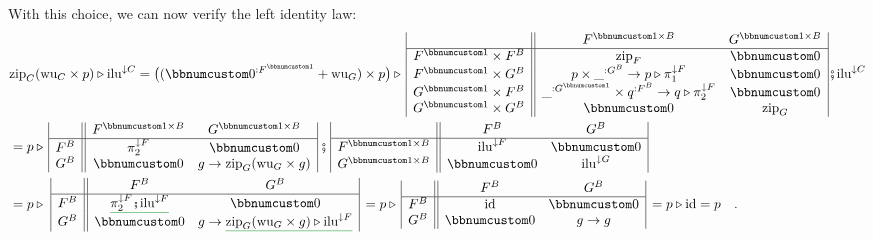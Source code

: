 With this choice, we can now verify the left identity law:
\begin{align*}
 & \text{zip}_{C}(\text{wu}_{C}\times p)\triangleright\text{ilu}^{\downarrow C}=\big((\bbnum 0^{:F^{\bbnum 1}}+\text{wu}_{G})\times p\big)\triangleright\,\begin{array}{|c||cc|}
 & F^{\bbnum 1\times B} & G^{\bbnum 1\times B}\\
\hline F^{\bbnum 1}\times F^{B} & \text{zip}_{F} & \bbnum 0\\
F^{\bbnum 1}\times G^{B} & p\times\_^{:G^{B}}\rightarrow p\triangleright\pi_{1}^{\downarrow F} & \bbnum 0\\
G^{\bbnum 1}\times F^{B} & \_^{:G^{\bbnum 1}}\times q^{:F^{B}}\rightarrow q\triangleright\pi_{2}^{\downarrow F} & \bbnum 0\\
G^{\bbnum 1}\times G^{B} & \bbnum 0 & \text{zip}_{G}
\end{array}\bef\text{ilu}^{\downarrow C}\\
 & =p\triangleright\,\begin{array}{|c||cc|}
 & F^{\bbnum 1\times B} & G^{\bbnum 1\times B}\\
\hline F^{B} & \pi_{2}^{\downarrow F} & \bbnum 0\\
G^{B} & \bbnum 0 & g\rightarrow\text{zip}_{G}(\text{wu}_{G}\times g)
\end{array}\,\bef\,\begin{array}{|c||cc|}
 & F^{B} & G^{B}\\
\hline F^{\bbnum 1\times B} & \text{ilu}^{\downarrow F} & \bbnum 0\\
G^{\bbnum 1\times B} & \bbnum 0 & \text{ilu}^{\downarrow G}
\end{array}\\
 & =p\triangleright\,\,\begin{array}{|c||cc|}
 & F^{B} & G^{B}\\
\hline F^{B} & \gunderline{\pi_{2}^{\downarrow F}\bef\text{ilu}^{\downarrow F}} & \bbnum 0\\
G^{B} & \bbnum 0 & g\rightarrow\gunderline{\text{zip}_{G}(\text{wu}_{G}\times g)\triangleright\text{ilu}^{\downarrow F}}
\end{array}\,=p\triangleright\,\begin{array}{|c||cc|}
 & F^{B} & G^{B}\\
\hline F^{B} & \text{id} & \bbnum 0\\
G^{B} & \bbnum 0 & g\rightarrow g
\end{array}\,=p\triangleright\text{id}=p\quad.
\end{align*}

